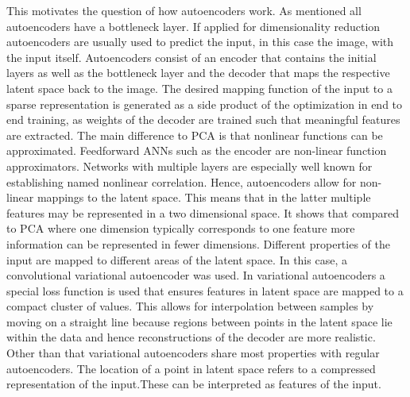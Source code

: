 This motivates the question of how autoencoders work. As mentioned all autoencoders have a bottleneck layer. If applied for dimensionality reduction autoencoders are usually used to predict the input, in this case the image, with the input itself. Autoencoders consist of an encoder that contains the initial layers as well as the bottleneck layer and the decoder that maps the respective latent space back to the image. The desired mapping function of the input to a sparse representation is generated as a side product of the optimization in end to end training, as weights of the decoder are trained such that meaningful features are extracted. The main difference to PCA is that nonlinear functions can be approximated. Feedforward ANNs such as the encoder are non-linear function approximators. Networks with multiple layers are especially well known for establishing named nonlinear correlation. Hence, autoencoders allow for non-linear mappings to the latent space. This means that in the latter multiple features may be represented in a two dimensional space. It shows that compared to PCA where one dimension typically corresponds to one feature more information can be represented in fewer dimensions. Different properties of the input are mapped to different areas of the latent space. In this case, a convolutional variational autoencoder was used. In variational autoencoders a special loss function is used that ensures features in latent space are mapped to a compact cluster of values. This allows for interpolation between samples by moving on a straight line because regions between points in the latent space lie within the data and hence reconstructions of the decoder are more realistic. Other than that variational autoencoders share most properties with regular autoencoders. The location of a point in latent space refers to a compressed representation of the input.These can be interpreted as features of the input. \\

